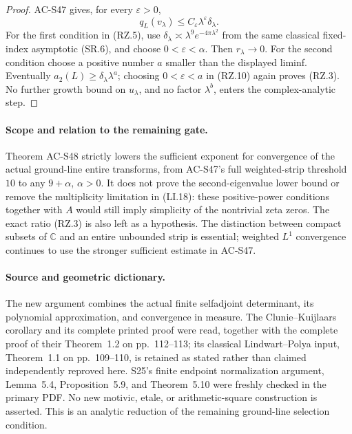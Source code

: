 \begin{proof}
AC-S47 gives, for every \(\varepsilon>0\),
\[
 q_L(v_\lambda)\le C_\varepsilon\lambda^\varepsilon
                                      \delta_\lambda.
 \tag{RZ.10}
\]
For the first condition in (RZ.5), use
\(\delta_\lambda\asymp\lambda^9e^{-4\pi\lambda^2}\)
from the same classical fixed-index asymptotic (SR.6), and choose
\(0<\varepsilon<\alpha\).  Then \(r_\lambda\to0\).
For the second condition choose a positive number \(a\) smaller
than the displayed liminf.  Eventually
\(a_2(L)\ge\delta_\lambda\lambda^a\); choosing
\(0<\varepsilon<a\) in (RZ.10) again proves (RZ.3).
No further growth bound on \(u_\lambda\), and no factor
\(\lambda^b\), enters the complex-analytic step.
\end{proof}

\paragraph{Scope and relation to the remaining gate.}
Theorem AC-S48 strictly lowers the sufficient exponent for convergence
of the actual ground-line entire transforms, from AC-S47's full
weighted-strip threshold \(10\) to any \(9+\alpha\), \(\alpha>0\).
It does not prove the second-eigenvalue lower bound or remove the
multiplicity limitation in (LI.18): these positive-power conditions
together with \(A\) would still imply simplicity of the nontrivial
zeta zeros.  The exact ratio (RZ.3) is also left as a hypothesis.
The distinction between compact subsets of \(\mathbb C\) and an
entire unbounded strip is essential; weighted \(L^1\) convergence
continues to use the stronger sufficient estimate in AC-S47.

\paragraph{Source and geometric dictionary.}
The new argument combines the actual finite selfadjoint determinant,
its polynomial approximation, and convergence in measure.  The
Clunie--Kuijlaars corollary and its complete printed proof were read,
together with the complete proof of their Theorem~1.2 on
pp.~112--113; its classical Lindwart--Polya input, Theorem~1.1 on
pp.~109--110, is retained as stated rather than claimed independently
reproved here.  S25's finite endpoint normalization argument,
Lemma~5.4, Proposition~5.9, and Theorem~5.10 were freshly checked in
the primary PDF.  No new motivic, etale, or arithmetic-square
construction is asserted.  This is an analytic reduction of the
remaining ground-line selection condition.

